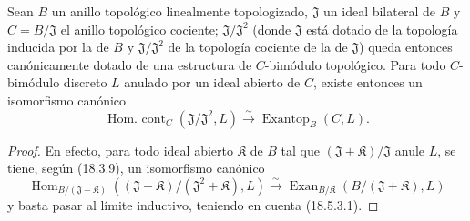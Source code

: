 \begin{proposition}[18.5.4]
\label{0.18.5.4-fr}
Sean $B$ un anillo topológico linealmente topologizado, $\mathfrak J$ un
ideal bilateral de $B$ y $C=B/\mathfrak J$ el anillo topológico cociente;
$\mathfrak J/\mathfrak J^2$ (donde $\mathfrak J$ está dotado de la topología inducida
por la de $B$ y $\mathfrak J/\mathfrak J^2$ de la topología cociente de
la de $\mathfrak J$) queda entonces canónicamente dotado de una estructura de
$C$-bimódulo topológico. Para todo $C$-bimódulo discreto $L$ anulado por un
ideal abierto de $C$, existe entonces un isomorfismo canónico
\begin{equation}
\label{0.18.5.4.1-fr}
\tag{18.5.4.1}
  \operatorname{Hom.\ cont}_C(\mathfrak J/\mathfrak J^2,L)
  \xrightarrow{\sim}\operatorname{Exantop}_B(C,L).
\end{equation}
\end{proposition}

\begin{proof}
En efecto, para todo ideal abierto $\mathfrak K$ de $B$ tal que
$(\mathfrak J+\mathfrak K)/\mathfrak J$ anule $L$, se tiene, según (18.3.9),
un isomorfismo canónico
\[
  \operatorname{Hom}_{B/(\mathfrak J+\mathfrak K)}
    ((\mathfrak J+\mathfrak K)/(\mathfrak J^2+\mathfrak K),L)
  \xrightarrow{\sim}
  \operatorname{Exan}_{B/\mathfrak K}(B/(\mathfrak J+\mathfrak K),L)
\]
y basta pasar al límite inductivo, teniendo en cuenta (18.5.3.1).
\end{proof}
